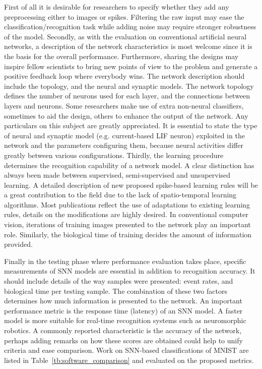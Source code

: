 \documentclass{frontiersENG} %
\begin{document}
First of all it is desirable for researchers to specify whether they add any preprocessing either to images or spikes.
Filtering the raw input may ease the classification/recognition task while adding noise may require stronger robustness of the model.
Secondly, as with the evaluation on conventional artificial neural networks, a description of the network characteristics is most welcome since it is the basis for the overall performance.
Furthermore, sharing the designs may inspire fellow scientists to bring new points of view to the problem and generate a positive feedback loop where everybody wins.
The network description should include the topology, and the neural and synaptic models.
The network topology defines the number of neurons used for each layer, and the connections between layers and neurons.
Some researchers make use of extra non-neural classifiers, sometimes to aid the design, others to enhance the output of the network.
Any particulars on this subject are greatly appreciated.
It is essential to state the type of neural and synaptic model (e.g. current-based LIF neuron) exploited in the network and the parameters configuring them, because neural activities differ greatly between various configurations.
Thirdly, the learning procedure determines the recognition capability of a network model.
A clear distinction has always been made between supervised, semi-supervised and unsupervised learning.
A detailed description of new proposed spike-based learning rules will be a great contribution to the field due to the lack of spatio-temporal learning algorithms.
Most publications reflect the use of adaptations to existing learning rules, details on the modifications are highly desired.
In conventional computer vision, iterations of training images presented to the network play an important role.
Similarly, the biological time of training decides the amount of information provided.

Finally in the testing phase where performance evaluation takes place, specific measurements of SNN models are essential in addition to recognition accuracy.
It should include details of the way samples were presented: event rates, and biological time per testing sample.
The combination of these two factors determines how much information is presented to the network.
An important performance metric is the response time (latency) of an SNN model.
A faster model is more suitable for real-time recognition systems such as neuromorphic robotics.
A commonly reported characteristic is the accuracy of the network, perhaps adding remarks on how these scores are obtained could help to unify criteria and ease comparison.
Work on SNN-based classifications of MNIST are listed in Table~\ref{tb:software_comparison} and evaluated on the proposed metrics.
\end{document}
